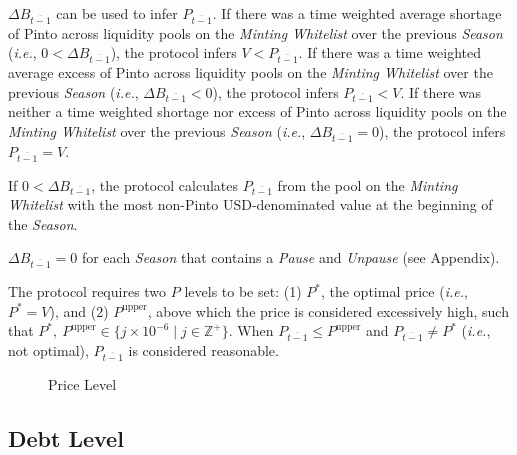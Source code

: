\documentclass[tikz]{article}
\makeatletter
\newenvironment{keepunit}{%
  \par\penalty0\begingroup
  \edef\keepunitparskip{\the\parskip}%
  \noindent\begin{minipage}[t]{\linewidth}%
  \setlength{\parskip}{\keepunitparskip}%
  \@minipagefalse
}{%
  \end{minipage}\par\endgroup
}
\newcommand{\term}[1]{\textsl{#1}}
\makeatother
\begin{document}
$\Delta B_{\overline{t-1}}$ can be used to infer $P_{\overline{t-1}}$. If there was a time weighted average shortage of Pinto across liquidity pools on the \term{Minting Whitelist} over the previous \term{Season} (\textit{i.e.}, $0 < \Delta B_{\overline{t-1}}$), the protocol infers $V < P_{\overline{t-1}}$. If there was a time weighted average excess of Pinto across liquidity pools on the \term{Minting Whitelist} over the previous \term{Season} (\textit{i.e.}, $\Delta B_{\overline{t-1}} < 0$), the protocol infers $P_{\overline{t-1}} < V$. If there was neither a time weighted shortage nor excess of Pinto across liquidity pools on the \term{Minting Whitelist} over the previous \term{Season} (\textit{i.e.}, $\Delta B_{\overline{t-1}} = 0$), the protocol infers $P_{\overline{t-1}} = V$. 

If $0 < \Delta B_{\overline{t-1}}$, the protocol calculates $P_{\overline{t-1}}$ from the pool on the \term{Minting Whitelist} with the most non-Pinto USD-denominated value at the beginning of the \term{Season}.

$\Delta B_{\overline{t-1}} = 0$ for each \term{Season} that contains a \term{Pause} and \term{Unpause} (see Appendix).

\begin{keepunit}
The protocol requires two $P$ levels to be set: (1) $P^{*}$, the optimal price (\textit{i.e.}, $P^{*} = V$), and (2) $P^{\text{upper}}$, above which the price is considered excessively high, such that $P^{*},\ P^{\text{upper}} \in \{j \times 10^{-6} \mid j \in \mathbb{Z}^{+} \}$. When $P_{\overline{t-1}} \leq P^{\text{upper}}$ and $P_{\overline{t-1}} \neq P^{*}$ (\textit{i.e.}, not optimal), $P_{\overline{t-1}}$ is considered reasonable.


\begin{figure}[H]
    \centering
    
    \vspace*{-7mm}
    \setlength{\belowcaptionskip}{-8pt} %
    \caption{Price Level}
    \label{Price Level}
\end{figure}
\end{keepunit}




\subsection{Debt Level}\label{sec:debt-level}
\end{document}
